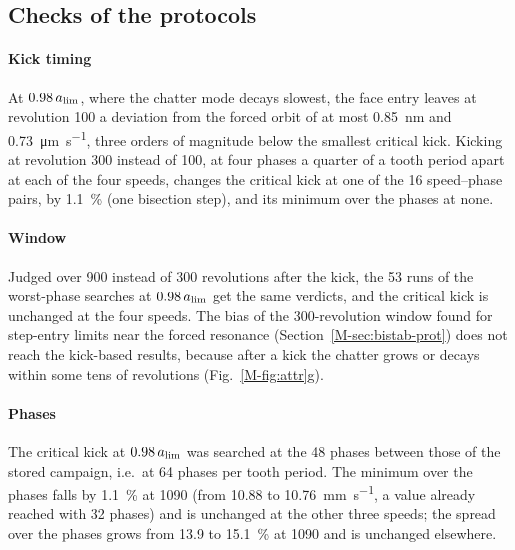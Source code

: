 \subsection{Checks of the protocols}\label{supp:bistab-checks}

\paragraph{Kick timing} At $0.98\,a_{\lim}$, where the chatter mode decays slowest, the face entry leaves at revolution 100 a deviation from the forced orbit of at most \SI{0.85}{\nano\metre} and \SI{0.73}{\micro\metre\per\second}, three orders of magnitude below the smallest critical kick. Kicking at revolution 300 instead of 100, at four phases a quarter of a tooth period apart at each of the four speeds, changes the critical kick at one of the 16 speed--phase pairs, by \SI{1.1}{\percent} (one bisection step), and its minimum over the phases at none.

\paragraph{Window} Judged over 900 instead of 300 revolutions after the kick, the 53 runs of the worst-phase searches at $0.98\,a_{\lim}$ get the same verdicts, and the critical kick is unchanged at the four speeds. The bias of the 300-revolution window found for step-entry limits near the forced resonance (Section~\ref{M-sec:bistab-prot}) does not reach the kick-based results, because after a kick the chatter grows or decays within some tens of revolutions (Fig.~\ref{M-fig:attr}g).

\paragraph{Phases} The critical kick at $0.98\,a_{\lim}$ was searched at the 48 phases between those of the stored campaign, i.e.\ at 64 phases per tooth period. The minimum over the phases falls by \SI{1.1}{\percent} at \SI{1090}{\rpm} (from 10.88 to \SI{10.76}{\milli\metre\per\second}, a value already reached with 32 phases) and is unchanged at the other three speeds; the spread over the phases grows from 13.9 to \SI{15.1}{\percent} at \SI{1090}{\rpm} and is unchanged elsewhere.

